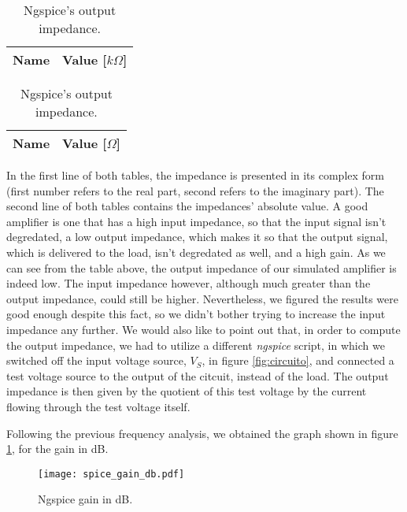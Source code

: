 \begin{table}[h]
  \parbox{.45\linewidth}{
    \centering
    \begin{tabular}{|c|c|}
      \hline
      {\bf Name} & {\bf Value [$k\Omega$]} \\ \hline
      
    \end{tabular}
    \caption{Ngspice's input impedance.}
  }
  \hfill
  \parbox{.45\linewidth}{
    \centering
    \begin{tabular}{|c|c|}
      \hline
      {\bf Name} & {\bf Value [$\Omega$]} \\ \hline
      
    \end{tabular}
    \caption{Ngspice's output impedance.}
  }
\end{table}

In the first line of both tables, the impedance is presented in its complex form (first number refers to the real part, second refers to the imaginary part).
The second line of both tables contains the impedances' absolute value.
A good amplifier is one that has a high input impedance, so that the input signal isn't degredated, a low output impedance, which makes it so that
the output signal, which is delivered to the load, isn't degredated as well, and a high gain. As we can see from the table above, the 
output impedance of our simulated amplifier is indeed low. The input impedance however, although much greater than the output impedance, could still be higher.
Nevertheless, we figured the results were good enough despite this fact, so we didn't bother trying to increase the input impedance any further.
We would also like to point out that, in order to compute the output impedance, we had to utilize a different \emph{ngspice} script, in which we switched 
off the input voltage source, $V_{S}$, in figure \ref{fig:circuito}, and connected a test voltage source to the output of the citcuit, instead of the load.
The output impedance is then given by the quotient of this test voltage by the current flowing through the test voltage itself.

Following the previous frequency analysis, we obtained the graph shown in figure \ref{fig:NgspiceGain_dB}, for the gain in dB.

\clearpage

\begin{figure}[h] \centering
  \texttt{[image: spice\_gain\_db.pdf]}
  \caption{Ngspice gain in dB.}
  \label{fig:NgspiceGain_dB}
\end{figure}

